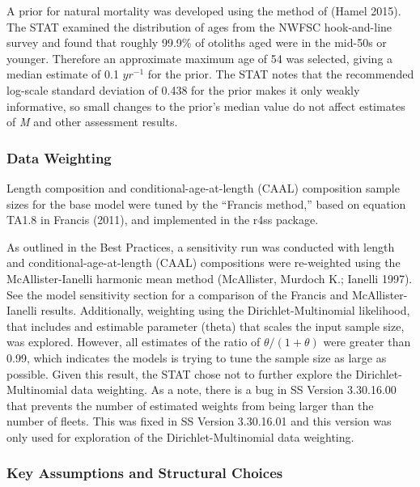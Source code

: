 \documentclass[
  english,
  a4paper,
]{article}
\begin{document}
A prior for natural mortality was developed using the method of (Hamel 2015). The STAT examined the distribution of ages from the NWFSC hook-and-line survey and found that roughly 99.9\% of otoliths aged were in the mid-50s or younger. Therefore an approximate maximum age of 54 was selected, giving a median estimate of 0.1 \(yr^{-1}\) for the prior. The STAT notes that the recommended log-scale standard deviation of 0.438 for the prior makes it only weakly informative, so small changes to the prior's median value do not affect estimates of \emph{M} and other assessment results.

\hypertarget{data-weighting}{%
\subsubsection{Data Weighting}\label{data-weighting}}

Length composition and conditional-age-at-length (CAAL) composition sample sizes for
the base model were tuned by the ``Francis method,'' based on equation TA1.8 in Francis
(2011), and implemented in the r4ss package.

As outlined in the Best Practices, a sensitivity run was conducted with length and
conditional-age-at-length (CAAL) compositions were re-weighted using the
McAllister-Ianelli harmonic mean method (McAllister, Murdoch K.; Ianelli 1997). See the model sensitivity section for a comparison of the Francis and McAllister-Ianelli results. Additionally, weighting
using the Dirichlet-Multinomial likelihood, that includes and estimable parameter (theta)
that scales the input sample size, was explored. However, all estimates of the ratio of
\(\theta/(1+\theta)\) were greater than 0.99, which indicates the models is trying to tune
the sample size as large as possible. Given this result, the STAT chose not to further explore
the Dirichlet-Multinomial data weighting. As a note, there is a bug in SS Version 3.30.16.00 that
prevents the number of estimated weights from being larger than the number of fleets. This was
fixed in SS Version 3.30.16.01 and this version was only used for exploration of the Dirichlet-Multinomial data weighting.

\hypertarget{key-assumptions-and-structural-choices}{%
\subsubsection{Key Assumptions and Structural Choices}\label{key-assumptions-and-structural-choices}}
\end{document}
